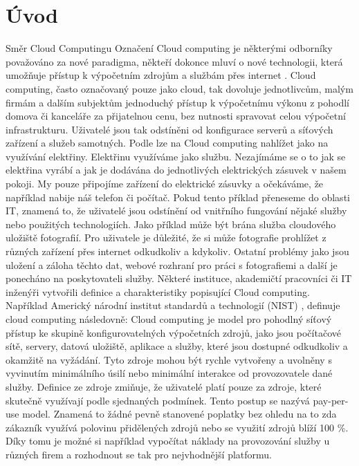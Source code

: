\chapter{Úvod}
\setcounter{page}{1}
Směr Cloud Computingu
Označení Cloud computing je některými odborníky považováno za nové paradigma, někteří dokonce mluví o nové technologii, která umožňuje přístup k výpočetním zdrojům a službám přes internet \cite{bohm2010cloud}. Cloud computing, často označovaný pouze jako cloud, tak dovoluje jednotlivcům, malým firmám a dalším subjektům jednoduchý přístup k výpočetnímu výkonu z pohodlí domova či kanceláře za přijatelnou cenu, bez nutnosti spravovat celou výpočetní infrastrukturu. Uživatelé jsou tak odstíněni od konfigurace serverů a síťových zařízení a služeb samotných. \newline
Podle \cite{cc2011principles} lze na Cloud computing nahlížet jako na využívání elektřiny. Elektřinu využíváme jako službu. Nezajímáme se o to jak se elektřina vyrábí a jak je dodávána do jednotlivých elektrických zásuvek v našem pokoji. My pouze připojíme zařízení do elektrické zásuvky a očekáváme, že například nabije náš telefon či počítač. Pokud tento příklad přeneseme do oblasti IT, znamená to, že uživatelé jsou odstínění od vnitřního fungování nějaké služby nebo použitých technologiích. Jako příklad může být brána služba cloudového uložiště fotografií. Pro uživatele je důležité, že si může fotografie prohlížet  z různých zařízení přes internet odkudkoliv a kdykoliv. Ostatní problémy jako jsou uložení a záloha těchto dat, webové rozhraní pro práci s fotografiemi a další je ponecháno na poskytovateli služby. \newline
Některé instituce, akademičtí pracovníci či IT inženýři vytvořili definice a charakteristiky  popisující Cloud computing. Například Americký národní institut standardů a technologií (NIST) \cite{mel2011nist}, definuje cloud computing následovně:
Cloud computing je model pro pohodlný síťový přístup ke skupině konfigurovatelných výpočetních zdrojů, jako jsou počítačové sítě, servery, datová uložiště, aplikace a služby, které jsou dostupné odkudkoliv a okamžitě na vyžádání. Tyto zdroje mohou být rychle vytvořeny a uvolněny  s vyvinutím minimálního úsilí nebo minimální interakce od provozovatele dané služby. \newline 
Definice ze zdroje \cite{Vaquero-cloud-definition} zmiňuje, že uživatelé platí pouze za zdroje, které skutečně využívají podle sjednaných podmínek. Tento postup se nazývá pay-per-use model. Znamená to žádné pevně stanovené poplatky bez ohledu na to zda zákazník využívá polovinu přidělených zdrojů nebo se využití zdrojů blíží 100 \%. Díky tomu je možné si například vypočítat náklady na provozování služby u různých firem a rozhodnout se tak pro nejvhodnější platformu. \newline

